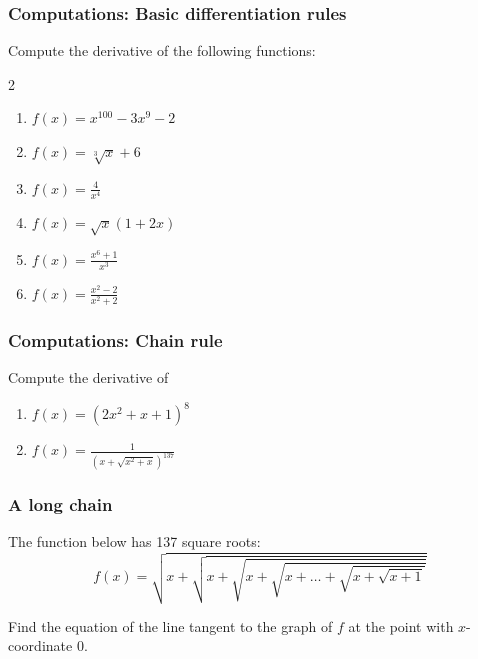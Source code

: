 \documentclass[14pt]{beamer}
\begin{document}
	\begin{frame}
		\frametitle{Computations: Basic differentiation rules}

		Compute the derivative of the following functions:

		\begin{multicols}{2}
			\begin{enumerate}
				\item $\displaystyle f(x) = x^{100}- 3x^{9}- 2$

				\item $\displaystyle f(x) = \sqrt[3]{x}+ 6$

				\item $\displaystyle f(x) = \frac{4}{x^{4}}$

				\item $\displaystyle f(x) = \sqrt{x}\left( 1 + 2x \right)$

				\item $\displaystyle f(x) = \frac{x^{6}+ 1}{x^{3}}$

				\item $\displaystyle f(x) = \frac{x^{2}-2}{x^{2}+2}$
			\end{enumerate}
		\end{multicols}
	\end{frame}


	\begin{frame}[t]
		\frametitle{Computations: Chain rule}

		Compute the derivative of

		\begin{enumerate}
			\item $\displaystyle f(x) = \left( 2x^{2}+x+1 \right)^{8}$

			\item $\displaystyle f(x) = \frac{1}{\left( x + \sqrt{x^2+x}\right)^{137}}$
		\end{enumerate}
	\end{frame}

	\begin{frame}[t]
		\frametitle{A long chain}

		The function below has 137 square roots:
		\[
			f(x) = \sqrt{x+ \sqrt{x +
			\sqrt{x + \sqrt{x+ \ldots + \sqrt{x + \sqrt{x+1}}}}}}
		\]

		Find the equation of the line tangent to the graph of $f$ at the point with
		$x$-coordinate $0$.
	\end{frame}
\end{document}
